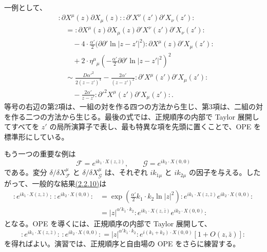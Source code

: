 一例として、
\begin{equation}
\begin{aligned}
&:\partial X^\mu(z)\partial X_\mu(z):
:\partial'X^\nu(z')\partial'X_\nu(z'):\\
&\quad=:\partial X^\mu(z)\partial X_\mu(z)
\partial'X^\nu(z')\partial'X_\nu(z'):\\
&\qquad-4\cdot\frac{\alpha'}2
\bigl(\partial\partial'\ln|z-z'|^2\bigr)
:\partial X^\mu(z)\partial'X_\mu(z'):\\
&\qquad+2\cdot\eta^\mu{}_\mu
\left(-\frac{\alpha'}2\partial\partial'\ln|z-z'|^2\right)^2\\
&\quad\sim\frac{D\alpha'^2}{2(z-z')^4}
-\frac{2\alpha'}{(z-z')^2}:\partial'X^\mu(z')\partial'X_\mu(z'):\\
&\qquad-\frac{2\alpha'}{z-z'}
:\partial'^2X^\mu(z')\partial'X_\mu(z'):.
\end{aligned}
\tag{2.2.11}\label{eq:2.2.11}
\end{equation}
等号の右辺の第2項は、一組の対を作る四つの方法から生じ、第3項は、二組の対を作る二つの方法から生じる。最後の式では、正規順序の内部で Taylor 展開してすべてを $z'$ の局所演算子で表し、最も特異な項を先頭に置くことで、OPE を標準形にしている。

もう一つの重要な例は
\begin{equation}
\mathcal F=e^{ik_1\cdot X(z,\bar z)},\qquad
\mathcal G=e^{ik_2\cdot X(0,0)}
\tag{2.2.12}\label{eq:2.2.12}
\end{equation}
である。変分 $\delta/\delta X_{\mathcal F}^\mu$ と
$\delta/\delta X_{\mathcal G}^\mu$ は、それぞれ $ik_{1\mu}$ と $ik_{2\mu}$ の因子を与える。したがって、一般的な結果\hyperref[eq:2.2.10]{(2.2.10)}は
\begin{equation}
\begin{aligned}
:e^{ik_1\cdot X(z,\bar z)}:\,:e^{ik_2\cdot X(0,0)}:
&=\exp\left(\frac{\alpha'}2k_1\cdot k_2\ln|z|^2\right)
:e^{ik_1\cdot X(z,\bar z)}e^{ik_2\cdot X(0,0)}:\\
&=|z|^{\alpha'k_1\cdot k_2}
:e^{ik_1\cdot X(z,\bar z)}e^{ik_2\cdot X(0,0)}:
\end{aligned}
\tag{2.2.13}\label{eq:2.2.13}
\end{equation}
となる。OPE を導くには、正規順序の内部で Taylor 展開して、
\begin{equation}
:e^{ik_1\cdot X(z,\bar z)}:\,:e^{ik_2\cdot X(0,0)}:
=|z|^{\alpha'k_1\cdot k_2}
:e^{i(k_1+k_2)\cdot X(0,0)}[1+O(z,\bar z)]:
\tag{2.2.14}\label{eq:2.2.14}
\end{equation}
を得ればよい。演習では、正規順序と自由場の OPE をさらに練習する。

